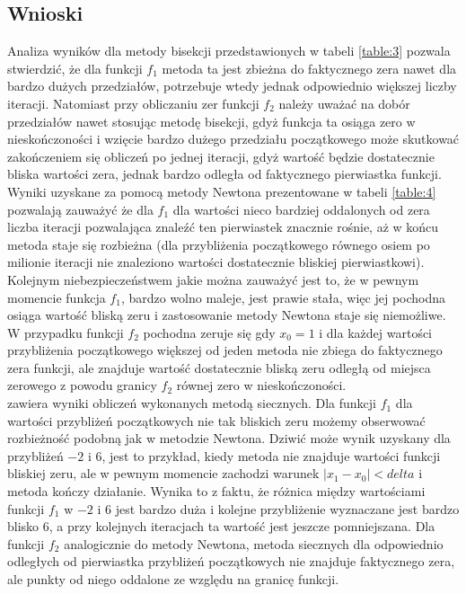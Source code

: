 \documentclass[11pt]{mk-polish-lab-report}
\begin{document}
\subsection{Wnioski}
Analiza wyników dla metody bisekcji przedstawionych w tabeli \ref{table:3} pozwala stwierdzić, że dla funkcji $f_1$ metoda ta jest zbieżna do faktycznego zera nawet dla bardzo dużych przedziałów, potrzebuje wtedy jednak odpowiednio większej liczby iteracji. Natomiast przy obliczaniu zer funkcji $f_2$ należy uważać na dobór przedziałów nawet stosując metodę bisekcji, gdyż funkcja ta osiąga zero w nieskończoności i wzięcie bardzo dużego przedziału początkowego może skutkować zakończeniem się obliczeń po jednej iteracji, gdyż wartość będzie dostatecznie bliska wartości zera, jednak bardzo odległa od faktycznego pierwiastka funkcji. \\
\linebreak
Wyniki uzyskane za pomocą metody Newtona prezentowane w tabeli \ref{table:4} pozwalają zauważyć że dla $f_1$ dla wartości nieco bardziej oddalonych od zera liczba iteracji pozwalająca znaleźć ten pierwiastek znacznie rośnie, aż w końcu metoda staje się rozbieżna (dla przybliżenia początkowego równego osiem po milionie iteracji nie znaleziono wartości dostatecznie bliskiej pierwiastkowi). Kolejnym niebezpieczeństwem jakie można zauważyć jest to, że w pewnym momencie funkcja $f_1$, bardzo wolno maleje, jest prawie stała, więc jej pochodna osiąga wartość bliską zeru i zastosowanie metody Newtona staje się niemożliwe. W przypadku funkcji $f_2$ pochodna zeruje się gdy $x_0 = 1$ i dla każdej wartości przybliżenia początkowego większej od jeden metoda nie zbiega do faktycznego zera funkcji, ale znajduje wartość dostatecznie bliską zeru odległą od miejsca zerowego z powodu granicy $f_2$ równej zero w nieskończoności. \\
\linebreak
{} zawiera wyniki obliczeń wykonanych metodą siecznych. Dla funkcji $f_1$ dla wartości przybliżeń początkowych nie tak bliskich zeru możemy obserwować rozbieżność podobną jak w metodzie Newtona. Dziwić może wynik uzyskany dla przybliżeń $-2$ i $6$, jest to przykład, kiedy metoda nie znajduje wartości funkcji bliskiej zeru, ale w pewnym momencie zachodzi warunek $|x_1 - x_0| < delta$ i metoda kończy działanie. Wynika to z faktu, że różnica między wartościami funkcji $f_1$ w $-2$ i $6$ jest bardzo duża i kolejne przybliżenie wyznaczane jest bardzo blisko $6$, a przy kolejnych iteracjach ta wartość jest jeszcze pomniejszana. Dla funkcji $f_2$ analogicznie do metody Newtona, metoda siecznych dla odpowiednio odległych od pierwiastka przybliżeń początkowych nie znajduje faktycznego zera, ale punkty od niego oddalone ze względu na granicę funkcji. \\
\end{document}

